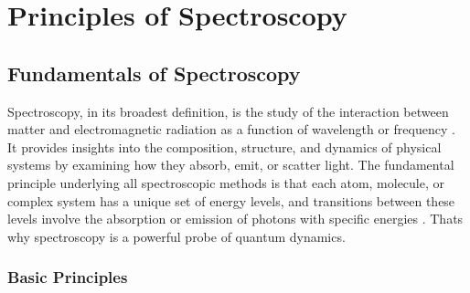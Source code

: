 \chapter{Principles of Spectroscopy}
\label{chapter_spectroscopy}

\section{Fundamentals of Spectroscopy}
\label{sec:spectroscopy_fundamentals}



\noindent 
Spectroscopy, in its broadest definition, is the study of the interaction between matter and electromagnetic radiation as a function of wavelength or frequency \cite{berman2011principleslaserspectroscopy, mukamel1995principlesnonlinearoptical}.
It provides insights into the composition, structure, and dynamics of physical systems by examining how they absorb, emit, or scatter light. The fundamental principle underlying all spectroscopic methods is that each atom, molecule, or complex system has a unique set of energy levels, and transitions between these levels involve the absorption or emission of photons with specific energies \cite{boyd2008chapter1nonlinear}. Thats why spectroscopy is a powerful probe of quantum dynamics.



\subsection{Basic Principles}
\label{subsec:basic_principles}

